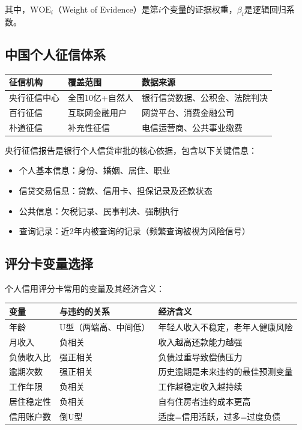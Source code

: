 其中，$\text{WOE}_i$（Weight of Evidence）是第$i$个变量的证据权重，$\beta_i$是逻辑回归系数。

\subsection{中国个人征信体系}

\begin{table}[H]
\centering
\begin{tabular}{lp{5cm}p{5cm}}
\toprule
\textbf{征信机构} & \textbf{覆盖范围} & \textbf{数据来源} \\
\midrule
央行征信中心 & 全国10亿+自然人 & 银行信贷数据、公积金、法院判决 \\
百行征信 & 互联网金融用户 & 网贷平台、消费金融公司 \\
朴道征信 & 补充性征信 & 电信运营商、公共事业缴费 \\
\bottomrule
\end{tabular}
\end{table}

央行征信报告是银行个人信贷审批的核心依据，包含以下关键信息：
\begin{itemize}[leftmargin=2em]
  \item 个人基本信息：身份、婚姻、居住、职业
  \item 信贷交易信息：贷款、信用卡、担保记录及还款状态
  \item 公共信息：欠税记录、民事判决、强制执行
  \item 查询记录：近2年内被查询的记录（频繁查询被视为风险信号）
\end{itemize}

\subsection{评分卡变量选择}

个人信用评分卡常用的变量及其经济含义：

\begin{table}[H]
\centering
\begin{tabular}{lp{3cm}p{6cm}}
\toprule
\textbf{变量} & \textbf{与违约的关系} & \textbf{经济含义} \\
\midrule
年龄 & U型（两端高、中间低） & 年轻人收入不稳定，老年人健康风险 \\
月收入 & 负相关 & 收入越高还款能力越强 \\
负债收入比 & 强正相关 & 负债过重导致偿债压力 \\
逾期次数 & 强正相关 & 历史逾期是未来违约的最佳预测变量 \\
工作年限 & 负相关 & 工作越稳定收入越持续 \\
居住稳定性 & 负相关 & 自有住房者违约成本更高 \\
信用账户数 & 倒U型 & 适度=信用活跃，过多=过度负债 \\
\bottomrule
\end{tabular}
\end{table}

